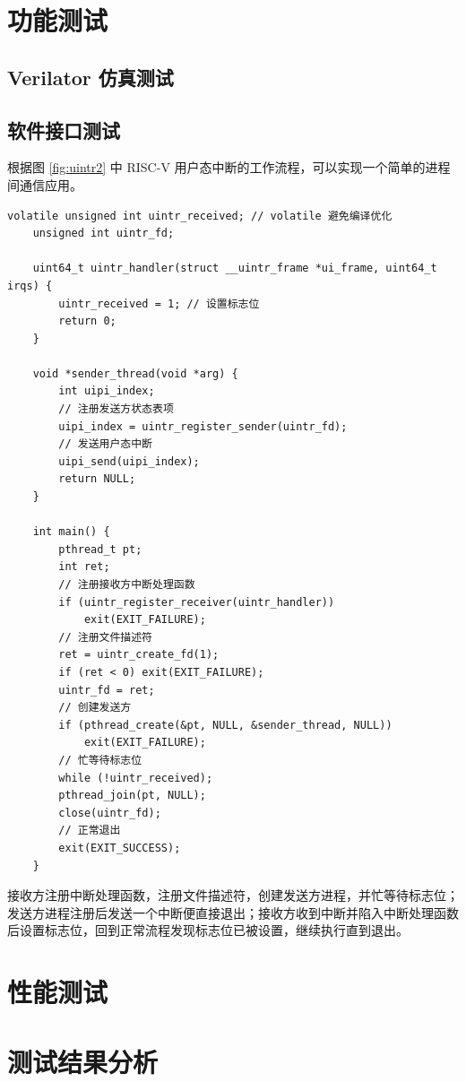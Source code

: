 \section{功能测试}

\subsection{Verilator 仿真测试}

\subsection{软件接口测试}

根据图 \ref{fig:uintr2} 中 RISC-V 用户态中断的工作流程，可以实现一个简单的进程间通信应用。

\begin{lstlisting}[style=CStyle]
    volatile unsigned int uintr_received; // volatile 避免编译优化
    unsigned int uintr_fd;

    uint64_t uintr_handler(struct __uintr_frame *ui_frame, uint64_t irqs) {
        uintr_received = 1; // 设置标志位
        return 0;
    }

    void *sender_thread(void *arg) {
        int uipi_index;
        // 注册发送方状态表项
        uipi_index = uintr_register_sender(uintr_fd);
        // 发送用户态中断
        uipi_send(uipi_index);
        return NULL;
    }

    int main() {
        pthread_t pt;
        int ret;
        // 注册接收方中断处理函数
        if (uintr_register_receiver(uintr_handler))
            exit(EXIT_FAILURE);
        // 注册文件描述符
        ret = uintr_create_fd(1);
        if (ret < 0) exit(EXIT_FAILURE);
        uintr_fd = ret;
        // 创建发送方
        if (pthread_create(&pt, NULL, &sender_thread, NULL))
            exit(EXIT_FAILURE);
        // 忙等待标志位
        while (!uintr_received);
        pthread_join(pt, NULL);
        close(uintr_fd);
        // 正常退出
        exit(EXIT_SUCCESS);
    }
\end{lstlisting}

接收方注册中断处理函数，注册文件描述符，创建发送方进程，并忙等待标志位；发送方进程注册后发送一个中断便直接退出；接收方收到中断并陷入中断处理函数后设置标志位，回到正常流程发现标志位已被设置，继续执行直到退出。

\section{性能测试}

\section{测试结果分析}